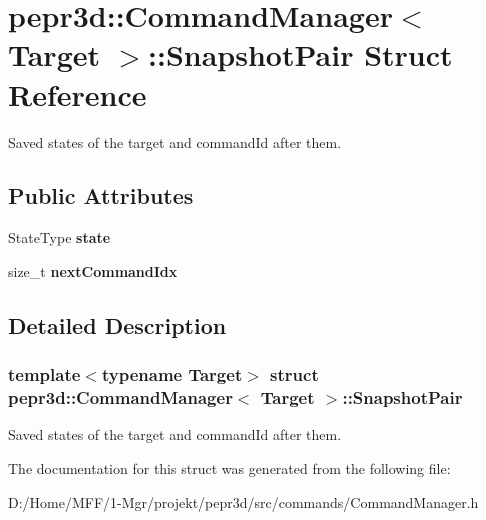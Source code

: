 \hypertarget{structpepr3d_1_1_command_manager_1_1_snapshot_pair}{}\section{pepr3d\+::Command\+Manager$<$ Target $>$\+::Snapshot\+Pair Struct Reference}
\label{structpepr3d_1_1_command_manager_1_1_snapshot_pair}


Saved states of the target and command\+Id after them.  


\subsection*{Public Attributes}
\begin{DoxyCompactItemize}
\item 
\mbox{\label{structpepr3d_1_1_command_manager_1_1_snapshot_pair_a3b793d6711396cf7feb889a612df341b}} 
State\+Type {\bfseries state}
\item 
\mbox{\label{structpepr3d_1_1_command_manager_1_1_snapshot_pair_a7d45becc86d3ab38e17ec6826170c856}} 
size\+\_\+t {\bfseries next\+Command\+Idx}
\end{DoxyCompactItemize}


\subsection{Detailed Description}
\subsubsection*{template$<$typename Target$>$\newline
struct pepr3d\+::\+Command\+Manager$<$ Target $>$\+::\+Snapshot\+Pair}

Saved states of the target and command\+Id after them. 

The documentation for this struct was generated from the following file\+:\begin{DoxyCompactItemize}
\item 
D\+:/\+Home/\+M\+F\+F/1-\/\+Mgr/projekt/pepr3d/src/commands/Command\+Manager.\+h\end{DoxyCompactItemize}
